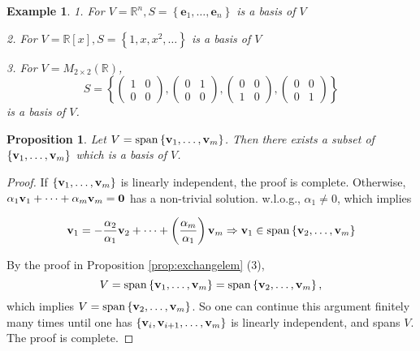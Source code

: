 \documentclass[11pt]{article}
\newtheorem{example}[theorem]{Example}
\newtheorem{proposition}[theorem]{Proposition}
\begin{document}
\begin{example} 
1. For \(V = {\mathbb{R}}^n,S = \left\{  {{\mathbf{e}}_1,\ldots ,{\mathbf{e}}_n}\right\}\) is a basis of \(V\)

2. For \(V = \mathbb{R}\left\lbrack  x\right\rbrack  ,S = \left\{  {1,x,{x}^2,\ldots }\right\}\) is a basis of \(V\)

3. For \(V = {M}_{2 \times  2}\left( \mathbb{R}\right)\),
\[
S = \left\{  {\left( \begin{array}{ll} 1 & 0 \\  0 & 0 \end{array}\right) ,\left( \begin{array}{ll} 0 & 1 \\  0 & 0 \end{array}\right) ,\left( \begin{array}{ll} 0 & 0 \\  1 & 0 \end{array}\right) ,\left( \begin{array}{ll} 0 & 0 \\  0 & 1 \end{array}\right) }\right\}
\]
is a basis of \(V\).
\end{example}

\begin{proposition} Let \(V = \operatorname{span}\left\{  {{\bf v}_1,\ldots ,{\bf v}_{m}}\right\}\). Then there exists a subset of \(\left\{  {{\bf v}_1,\ldots ,{\bf v}_{m}}\right\}\) which is a basis of \(V\).
\end{proposition}

\begin{proof} If \(\left\{  {{\bf v}_1,\ldots ,{\bf v}_{m}}\right\}\) is linearly independent, the proof is complete. Otherwise, \(\alpha_1{\bf v}_1 + \cdots  + \alpha_{m}{\bf v}_{m} = \mathbf{0}\) has a non-trivial solution. w.l.o.g., \(\alpha_1 \neq  0\), which implies

\[
{\bf v}_1 =  - \frac{\alpha_2}{\alpha_1}{\bf v}_2 + \cdots  + \left( \frac{\alpha_{m}}{\alpha_1}\right) {\bf v}_{m} \Rightarrow  {\bf v}_1 \in  \operatorname{span}\left\{  {{\bf v}_2,\ldots ,{\bf v}_{m}}\right\}
\]

By the proof in Proposition \ref{prop:exchangelem} (3),
\[
V =\operatorname{span}\left\{  {{\bf v}_1,\ldots ,{\bf v}_{m}}\right\}   = \operatorname{span}\left\{  {{\bf v}_2,\ldots ,{\bf v}_{m}}\right\}  ,
\]
which implies \(V = \operatorname{span}\left\{  {{\bf v}_2,\ldots ,{\bf v}_{m}}\right\}\).
So one can continue this argument finitely many times until one has \(\left\{  {{\bf v}_{i},{\bf v}_{i + 1},\ldots ,{\bf v}_{m}}\right\}\) is linearly independent, and spans \(V\). The proof is complete.
\end{proof}
\end{document}
